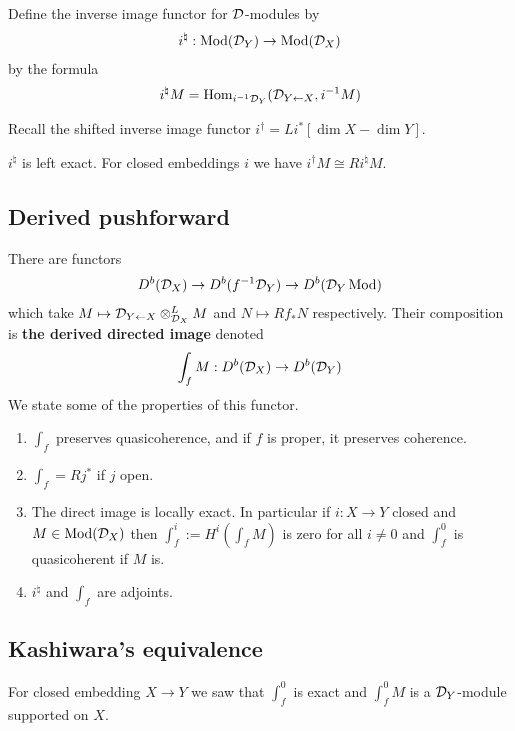 \begin{definition}
	Define the inverse image functor for ${\mathcal{D}}$-modules by \begin{align*}
		i^\natural : \operatorname{Mod}({\mathcal{D}}_Y) \to \operatorname{Mod}({\mathcal{D}}_X)
	\end{align*} by the formula \begin{align*}
		i^\natural M = \operatorname{Hom}_{i^{-1}{\mathcal{D}}_Y}({\mathcal{D}}_{Y\leftarrow X},{i}^{-1}M)
	\end{align*}
\end{definition}
Recall the shifted inverse image functor $i^\dagger  = Li^*[\dim X - \dim Y]$.

\begin{proposition}
	$i^\natural$ is left exact. For closed embeddings $i$ we have $i^\dagger M\cong Ri^\natural M$.
\end{proposition}

\subsection{Derived pushforward}
There are functors \begin{align*}
	D^b({\mathcal{D}}_X) \to D^b(f^{-1}{\mathcal{D}}_Y) \to D^b({\mathcal{D}}_Y\operatorname{Mod})
\end{align*}
which take $M \mapsto {\mathcal{D}}_{Y\leftarrow X}\otimes_{{\mathcal{D}}_X}^L M$ and $N\mapsto Rf_*N$ respectively.
Their composition is \textbf{the derived directed image }denoted \begin{align*}
	\int_f M: D^b({\mathcal{D}}_X) \to D^b({\mathcal{D}}_Y)
\end{align*} We state some of the properties of this functor.
\begin{proposition}
	\hfill
	\begin{enumerate}
		\item $\int_f$ preserves quasicoherence, and if $f$ is proper, it preserves coherence.
		\item $\int_f = Rj^*$ if $j$ open.
		\item The direct image is locally exact. In particular if $i:X\to Y$ closed and $M\in\operatorname{Mod}({\mathcal{D}}_X)$ then
		      $\int_f^i := H^i(\int_f M)$ is zero for all $i\neq 0$ and $\int_f^0$ is quasicoherent if $M$ is.
		\item $i^\natural$ and $\int_f$ are adjoints.
	\end{enumerate}
\end{proposition}

\subsection{Kashiwara's equivalence}
For closed embedding $X\to Y$ we saw that $\int_f^0$ is exact and $\int_f^0 M$ is a ${\mathcal{D}}_Y$-module
supported on $X$. 

